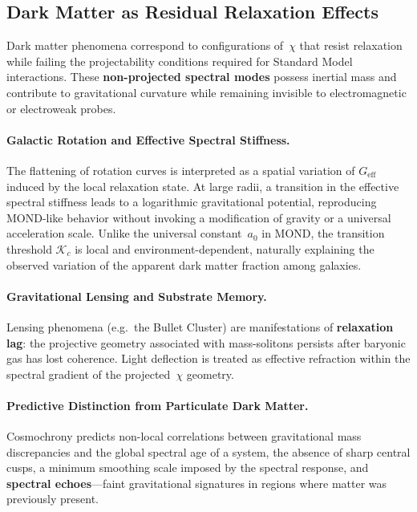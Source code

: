 \subsection{Dark Matter as Residual Relaxation Effects}
\label{subsec:dark-matter-phenomenology}

Dark matter phenomena correspond to configurations of~$\chi$ that resist
relaxation while failing the projectability conditions required for
Standard Model interactions.
These \textbf{non-projected spectral modes} possess inertial mass and
contribute to gravitational curvature while remaining invisible to
electromagnetic or electroweak probes.

\paragraph{Galactic Rotation and Effective Spectral Stiffness.}
The flattening of rotation curves is interpreted as a spatial variation of
$G_{\mathrm{eff}}$ induced by the local relaxation state.
At large radii, a transition in the effective spectral stiffness leads to
a logarithmic gravitational potential, reproducing MOND-like behavior
without invoking a modification of gravity or a universal acceleration
scale.
Unlike the universal constant~$a_0$ in MOND, the transition threshold
$\mathcal{K}_c$ is local and environment-dependent, naturally explaining
the observed variation of the apparent dark matter fraction among
galaxies.

\paragraph{Gravitational Lensing and Substrate Memory.}
Lensing phenomena (e.g.\ the Bullet Cluster) are manifestations of
\textbf{relaxation lag}: the projective geometry associated with
mass-solitons persists after baryonic gas has lost coherence.
Light deflection is treated as effective refraction within the spectral
gradient of the projected~$\chi$ geometry.

\paragraph{Predictive Distinction from Particulate Dark Matter.}
Cosmochrony predicts non-local correlations between gravitational mass
discrepancies and the global spectral age of a system, the absence of
sharp central cusps, a minimum smoothing scale imposed by the spectral
response, and \textbf{spectral echoes}---faint gravitational signatures
in regions where matter was previously present.
